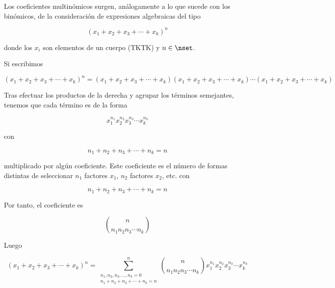 Los coeficientes multinómicos surgen, análogamente a lo que sucede con los
binómicos, de la consideración de expresiones algebraicas del tipo

$$ (x_1 + x_2 + x_3 + \cdots + x_k)^n $$

\noindent donde los $x_i$ son elementos de un cuerpo (TKTK) y $n \in \nset$.

Si escribimos

$$ (x_1 + x_2 + x_3 + \cdots + x_k)^n = (x_1 + x_2 + x_3 + \cdots + x_k)(x_1
+ x_2 + x_3 + \cdots + x_k) \cdots (x_1 + x_2 + x_3 + \cdots + x_k) $$

Tras efectuar los productos de la derecha y agrupar los términos semejantes,
tenemos que cada término es de la forma

$$ x_1^{n_1} x_2^{n_2} x_3^{n_3} \cdots x_k^{n_k} $$

\noindent con

$$ n_1 + n_2 + n_3 + \cdots + n_k = n $$

\noindent multiplicado por algún coeficiente. Este coeficiente es el número
de formas distintas de seleccionar $n_1$ factores $x_1$, $n_2$ factores
$x_2$, etc. con

$$ n_1 + n_2 + n_3 + \cdots + n_k = n $$

\noindent Por tanto, el coeficiente es

$$ {n \choose n_1 n_2 n_3 \cdots n_k} $$

\noindent Luego

$$ (x_1 + x_2 + x_3 + \cdots + x_k)^n = \sum_{\substack{n_1, n_2, n_3,
\ldots, n_k = 0 \\ n_1 + n_2 + n_3 + \cdots + n_k = n}}^n {n \choose n_1 n_2
n_3 \cdots n_k} x_1^{n_1} x_2^{n_2} x_3^{n_3} \cdots x_k^{n_k} $$





